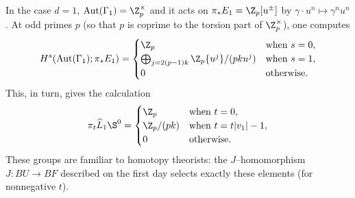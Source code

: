 \begin{example}[Adams]
In the case $d = 1$, $\operatorname{Aut}(\Gamma_1) = \Z_p^\times$ and it acts on $\pi_* E_1 = \Z_p[u^\pm]$ by $\gamma \cdot u^n \mapsto \gamma^n u^n$.  At odd primes $p$ (so that $p$ is coprime to the torsion part of $\Z_p^\times$), one computes \[H^s(\operatorname{Aut}(\Gamma_1); \pi_* E_1) = \begin{cases}\Z_p & \text{when $s = 0$}, \\ \bigoplus_{j = 2(p-1)k} \Z_p\{u^j\} / (pk u^j) & \text{when $s = 1$}, \\ 0 & \text{otherwise}. \end{cases}\]  This, in turn, gives the calculation \[\pi_t \widehat L_1 \S^0 = \begin{cases} \Z_p & \text{when $t = 0$}, \\ \Z_p / (pk) & \text{when $t = t|v_1| - 1$}, \\ 0 & \text{otherwise}. \end{cases}\]  These groups are familiar to homotopy theorists: the $J$--homomorphism $J: BU \to BF$ described on the first day selects exactly these elements (for nonnegative $t$).  
\end{example}








